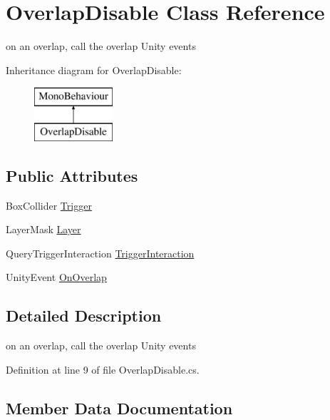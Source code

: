 \hypertarget{class_overlap_disable}{}\section{Overlap\+Disable Class Reference}
\label{class_overlap_disable}


on an overlap, call the overlap Unity events  


Inheritance diagram for Overlap\+Disable\+:\begin{figure}[H]
\begin{center}
\leavevmode
\includegraphics[height=2.000000cm]{class_overlap_disable}
\end{center}
\end{figure}
\subsection*{Public Attributes}
\begin{DoxyCompactItemize}
\item 
Box\+Collider \mbox{\hyperlink{class_overlap_disable_a44594a05e148a89bccf72a28118c4b7b}{Trigger}}
\item 
Layer\+Mask \mbox{\hyperlink{class_overlap_disable_a2be6a8a821b3e6a880df908cba7fa137}{Layer}}
\item 
Query\+Trigger\+Interaction \mbox{\hyperlink{class_overlap_disable_a892d2260d9b94ca5d7dc0c060806fda4}{Trigger\+Interaction}}
\item 
Unity\+Event \mbox{\hyperlink{class_overlap_disable_a696861a2d9acb813d1229f5505707432}{On\+Overlap}}
\end{DoxyCompactItemize}


\subsection{Detailed Description}
on an overlap, call the overlap Unity events 



Definition at line 9 of file Overlap\+Disable.\+cs.



\subsection{Member Data Documentation}
\mbox{\label{class_overlap_disable_a2be6a8a821b3e6a880df908cba7fa137}} 
